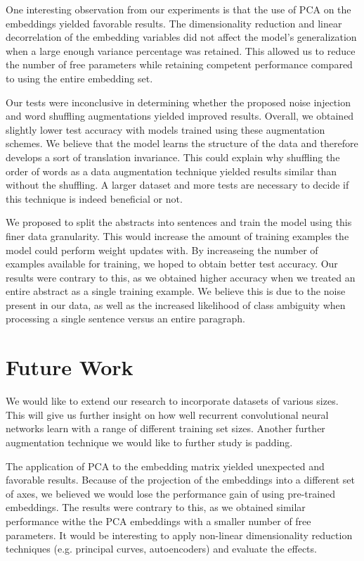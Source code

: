 One interesting observation from our experiments is that the use of PCA on the embeddings yielded favorable results. The dimensionality reduction and linear decorrelation of the embedding
variables did not affect the model's generalization when a large enough variance percentage was retained. This allowed us to reduce the number of free parameters
while retaining competent performance compared to using the entire embedding set.

Our tests were inconclusive in determining whether the proposed noise injection and word shuffling augmentations yielded improved results. Overall, we obtained slightly
lower test accuracy with models trained using these augmentation schemes. We believe that the
model learns the structure of the data and therefore develops a sort of translation invariance. This could explain why shuffling the order of words as a data augmentation
technique yielded results similar than without the shuffling.
A larger dataset and more tests are necessary to decide if this technique is indeed beneficial or not.

We proposed to split the abstracts into sentences and train the model using this finer data granularity. This would increase the amount of training examples
the model could perform weight updates with. By increaseing the number of examples available for training, we hoped to obtain better test accuracy.
Our results were contrary to this, as we obtained higher accuracy when we treated an entire abstract as a single training example.
We believe this is due to the noise present in our data, as well as the increased likelihood of class ambiguity when processing a single sentence versus an entire
paragraph.

\section{Future Work}
We would like to extend our research to incorporate datasets of various sizes. This will give us further insight on how
well recurrent convolutional neural networks learn with a range of different training set sizes. Another further augmentation technique we would like to further
study is padding.

The application of PCA to the embedding matrix yielded unexpected and favorable results. Because of the projection of the embeddings into a different set of axes,
we believed we would lose the performance gain of using pre-trained embeddings. The results were contrary to this, as we obtained similar performance
withe the PCA embeddings with a smaller number of free parameters. It would be interesting to apply non-linear dimensionality
reduction techniques (e.g. principal curves, autoencoders) and evaluate the effects.

